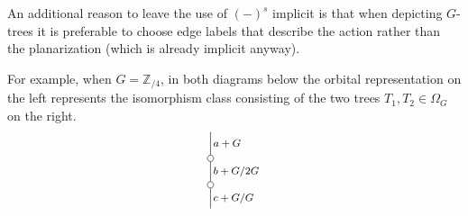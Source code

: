 \documentclass[a4paper,10pt]{article}%
\begin{document}
\begin{example}
An additional reason to leave the use of $(\minus)^s$ implicit
is that when depicting $G$-trees it is preferable to choose edge labels that describe the action rather than the planarization (which is already implicit anyway).

For example, when $G = \mathbb{Z}_{/4}$, in both diagrams below the orbital representation on the left represents the isomorphism class consisting of the two trees $T_1,T_2 \in \Omega_G$ on the right.
\[
	\begin{tikzpicture}[grow=up,auto,level distance=2.1em,
	every node/.style = {font=\footnotesize,inner sep=2pt},
	dummy/.style={circle,draw,inner sep=0pt,minimum size=1.75mm}]
		\node at (-1,0) {}
			child{node [dummy] {}
				child{node [dummy] {}
					child{
					edge from parent node [swap] {$a+G$}}
				edge from parent node [swap] {$b+G/2G$}}
			edge from parent node [swap] {$c + G/G$}};


\end{tikzpicture}\]
\end{example}
\end{document}
